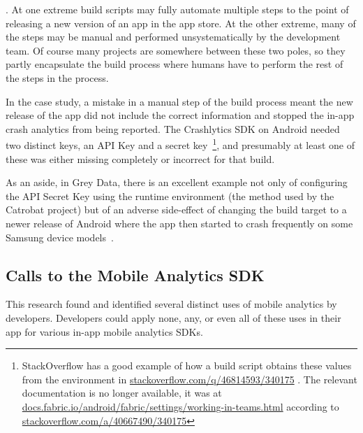 .  
At one extreme build scripts may fully automate multiple steps to the point of releasing a new version of an app in the app store. At the other extreme, many of the steps may be manual and performed unsystematically by the development team. Of course many projects are somewhere between these two poles, so they partly encapsulate the build process where humans have to perform the rest of the steps in the process. 

In the  case study, a mistake in a manual step of the build process meant the new release of the  app did not include the correct information and stopped the in-app crash analytics from being reported. The Crashlytics SDK on Android needed two distinct keys, an API Key and a secret key~\footnote{StackOverflow has a good example of how a build script obtains these values from the environment in \href{https://stackoverflow.com/q/46814593/340175}{stackoverflow.com/q/46814593/340175}%
. 
The relevant documentation is no longer available, it was at \href{https://docs.fabric.io/android/fabric/settings/working-in-teams.html}{docs.fabric.io/android/fabric/settings/working-in-teams.html} according to \href{https://stackoverflow.com/a/40667490/340175}{stackoverflow.com/a/40667490/340175}}, and presumably at least one of these was either missing completely or incorrect for that build.

As an aside, in Grey Data, there is an excellent example not only of configuring the API Secret Key using the runtime environment (the method used by the Catrobat project) but of an adverse side-effect of changing the build target to a newer release of Android where the app then started to crash frequently on some Samsung device models~. 


\subsection{Calls to the Mobile Analytics SDK}
This research found and identified several distinct uses of mobile analytics by developers. Developers could apply none, any, or even all of these uses in their app for various in-app mobile analytics SDKs.

